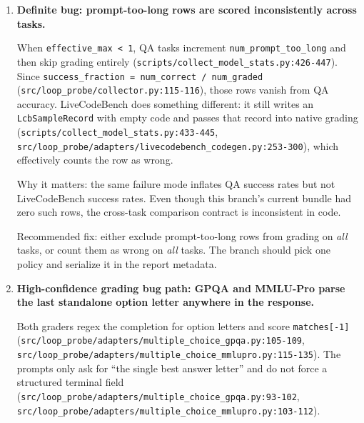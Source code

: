 \documentclass[11pt]{article}
\begin{document}
\begin{enumerate}
Why it matters: the current report wording ``hit max model length'' can be read as
``the model hit its native context limit'' even though the implementation is only
detecting exhaustion of the configured local cap. This is especially risky because the
Qwen3-1.7B model card advertises a 32{,}768-token context window, while the collector
is configured to 40{,}960.

Recommended fix: rename the metric to something like
\texttt{effective\_context\_cap\_hit}, log both prompt length and configured cap, and
either justify the 40{,}960 override or reduce it to a validated value.

\item \textbf{Definite bug: prompt-too-long rows are scored inconsistently across
tasks.}

When \texttt{effective\_max < 1}, QA tasks increment
\texttt{num\_prompt\_too\_long} and then skip grading entirely
(\texttt{scripts/collect\_model\_stats.py:426-447}). Since
\texttt{success\_fraction = num\_correct / num\_graded}
(\texttt{src/loop\_probe/collector.py:115-116}), those rows vanish from QA accuracy.
LiveCodeBench does something different: it still writes an
\texttt{LcbSampleRecord} with empty code and passes that record into native grading
(\texttt{scripts/collect\_model\_stats.py:433-445},
\texttt{src/loop\_probe/adapters/livecodebench\_codegen.py:253-300}), which
effectively counts the row as wrong.

Why it matters: the same failure mode inflates QA success rates but not
LiveCodeBench success rates. Even though this branch's current bundle had zero such
rows, the cross-task comparison contract is inconsistent in code.

Recommended fix: either exclude prompt-too-long rows from grading on \emph{all}
tasks, or count them as wrong on \emph{all} tasks. The branch should pick one policy
and serialize it in the report metadata.

\item \textbf{High-confidence grading bug path: GPQA and MMLU-Pro parse the last
standalone option letter anywhere in the response.}

Both graders regex the completion for option letters and score \texttt{matches[-1]}
(\texttt{src/loop\_probe/adapters/multiple\_choice\_gpqa.py:105-109},
\texttt{src/loop\_probe/adapters/multiple\_choice\_mmlupro.py:115-135}). The prompts
only ask for ``the single best answer letter'' and do not force a structured terminal
field (\texttt{src/loop\_probe/adapters/multiple\_choice\_gpqa.py:93-102},
\texttt{src/loop\_probe/adapters/multiple\_choice\_mmlupro.py:103-112}).


\end{enumerate}
\end{document}
